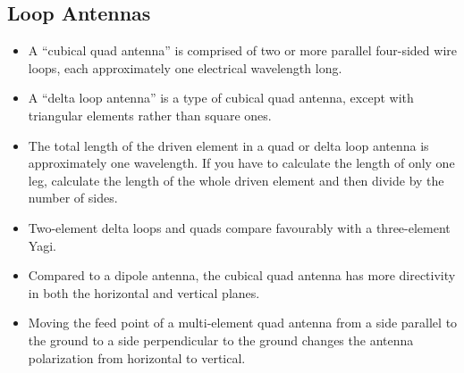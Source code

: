 \documentclass[letterpaper,12pt]{article}
\begin{document}
\subsection{Loop Antennas}

\begin{itemize}
\item A ``cubical quad antenna'' is comprised of two or more parallel four-sided wire loops, each approximately one electrical wavelength long.
\item A ``delta loop antenna'' is a type of cubical quad antenna, except with triangular elements rather than square ones.
\item The total length of the driven element in a quad or delta loop antenna is approximately one wavelength.
If you have to calculate the length of only one leg, calculate the length of the whole driven element and then divide by the number of sides.
\item Two-element delta loops and quads compare favourably with a three-element Yagi.
\item Compared to a dipole antenna, the cubical quad antenna has more directivity in both the horizontal and vertical planes.
\item Moving the feed point of a multi-element quad antenna from a side parallel to the ground to a side perpendicular to the ground
changes the antenna polarization from horizontal to vertical.
\end{itemize}
\end{document}
